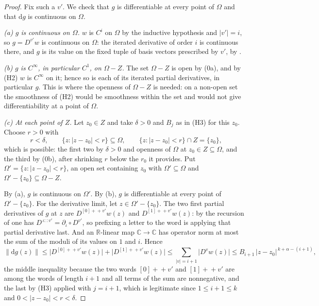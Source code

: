 \begin{proof}
Fix such a $v'$.  We check that $g$ is differentiable at every point of
$\Omega$ and that $\mathrm{d}g$ is continuous on $\Omega$.

\emph{(a) $g$ is continuous on $\Omega$.}  $w$ is $C^{i}$ on $\Omega$ by the
inductive hypothesis and $|v'|=i$, so $g=D^{v'}w$ is continuous on $\Omega$:
the iterated derivative of order $i$ is continuous there, and $g$ is its value
on the fixed tuple of basis vectors prescribed by $v'$, by
.

\emph{(b) $g$ is $C^\infty$, in particular $C^1$, on $\Omega-Z$.}  The set
$\Omega-Z$ is open by (0a), and by (H2) $w$ is $C^\infty$ on it; hence so is
each of its iterated partial derivatives, in particular $g$.  This is where the
openness of $\Omega-Z$ is needed: on a non-open set the smoothness of (H2)
would be smoothness within the set and would not give differentiability at a
point of $\Omega$.

\emph{(c) At each point of $Z$.}  Let $z_0\in Z$ and take $\delta>0$ and $B_j$
as in (H3) for this $z_0$.  Choose $r>0$ with
\[
  r<\delta,\qquad \{z:|z-z_0|<r\}\subseteq\Omega,\qquad
  \{z:|z-z_0|<r\}\cap Z=\{z_0\} ,
\]
which is possible: the first two by $\delta>0$ and openness of $\Omega$ at
$z_0\in Z\subseteq\Omega$, and the third by (0b), after shrinking $r$ below the
$r_0$ it provides.  Put
$\Omega'=\{z:|z-z_0|<r\}$, an open set containing $z_0$ with
$\Omega'\subseteq\Omega$ and $\Omega'-\{z_0\}\subseteq\Omega-Z$.

By (a), $g$ is continuous on $\Omega'$.  By (b), $g$ is differentiable at every
point of $\Omega'-\{z_0\}$.  For the derivative limit, let
$z\in\Omega'-\{z_0\}$.  The two first partial derivatives of $g$ at $z$ are
$D^{[0]+\!\!+v'}w(z)$ and $D^{[1]+\!\!+v'}w(z)$: by the recursion of
 one has $D^{\,\iota::v'}=\partial_\iota\circ D^{v'}$, so
prefixing a letter to the word is applying that partial derivative last.  And
an $\mathbb{R}$-linear map $\mathbb{C}\to\mathbb{C}$ has operator norm at most
the sum of the moduli of its values on $1$ and $i$.  Hence
\[
  \bigl\|\mathrm{d}g(z)\bigr\|
  \le\bigl|D^{[0]+\!\!+v'}w(z)\bigr|+\bigl|D^{[1]+\!\!+v'}w(z)\bigr|
  \le\sum_{|v|=i+1}\bigl|D^{v}w(z)\bigr|
  \le B_{i+1}\,|z-z_0|^{\,k+\alpha-(i+1)},
\]
the middle inequality because the two words $[0]\!+\!\!+v'$ and
$[1]\!+\!\!+v'$ are among the words of length $i+1$ and all terms of the sum
are nonnegative, and the last by (H3) applied with $j=i+1$, which is legitimate
since $1\le i+1\le k$ and $0<|z-z_0|<r<\delta$.


\end{proof}
